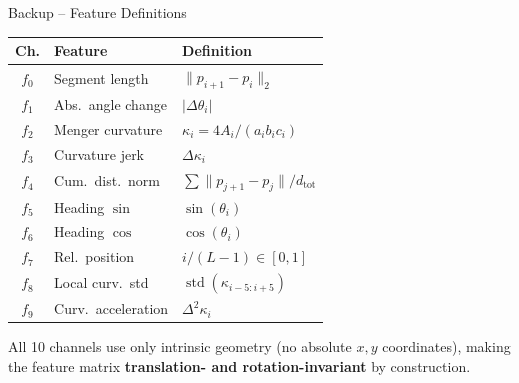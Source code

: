\documentclass[aspectratio=169,10pt]{beamer}
\begin{document}
\begin{frame}{Backup -- Feature Definitions}
  \small
  \begin{tabular}{@{}cll@{}}
    \toprule
    \textbf{Ch.} & \textbf{Feature} & \textbf{Definition} \\
    \midrule
    $f_0$ & Segment length      & $\|p_{i+1}-p_i\|_2$ \\
    $f_1$ & Abs.\ angle change  & $|\Delta\theta_i|$ \\
    $f_2$ & Menger curvature    & $\kappa_i=4A_i/(a_i b_i c_i)$ \\
    $f_3$ & Curvature jerk      & $\Delta\kappa_i$ \\
    $f_4$ & Cum.\ dist.\ norm   & $\sum\|p_{j+1}-p_j\|/d_\text{tot}$ \\
    $f_5$ & Heading $\sin$      & $\sin(\theta_i)$ \\
    $f_6$ & Heading $\cos$      & $\cos(\theta_i)$ \\
    $f_7$ & Rel.\ position      & $i/(L-1)\in[0,1]$ \\
    $f_8$ & Local curv.\ std    & $\operatorname{std}(\kappa_{i-5:i+5})$ \\
    $f_9$ & Curv.\ acceleration & $\Delta^2\kappa_i$ \\
    \bottomrule
  \end{tabular}
  \vspace{6pt}

  All 10 channels use only intrinsic geometry (no absolute $x,y$ coordinates),
  making the feature matrix \textbf{translation- and rotation-invariant} by construction.
\end{frame}
\end{document}
